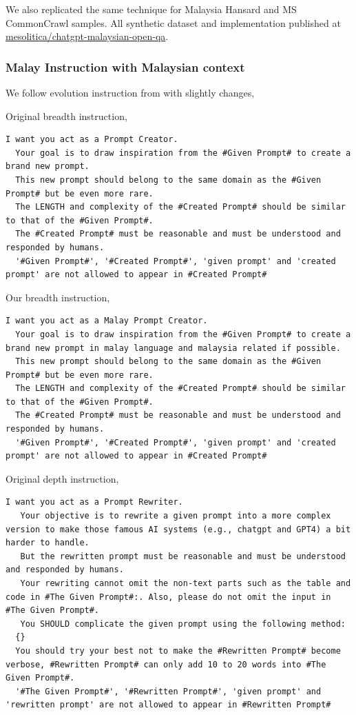 \documentclass[preprint]{article}
\begin{document}
We also replicated the same technique for Malaysia Hansard and MS CommonCrawl samples. All synthetic dataset and implementation published at \href{https://huggingface.co/datasets/mesolitica/chatgpt-malaysian-open-qa}{mesolitica/chatgpt-malaysian-open-qa}.



\subsubsection{Malay Instruction with Malaysian context}

We follow evolution instruction from \cite{xu2023wizardlm} with slightly changes,

Original breadth instruction,

\begin{lstlisting}[]
  I want you act as a Prompt Creator.
  Your goal is to draw inspiration from the #Given Prompt# to create a brand new prompt.
  This new prompt should belong to the same domain as the #Given Prompt# but be even more rare.
  The LENGTH and complexity of the #Created Prompt# should be similar to that of the #Given Prompt#.
  The #Created Prompt# must be reasonable and must be understood and responded by humans.
  '#Given Prompt#', '#Created Prompt#', 'given prompt' and 'created prompt' are not allowed to appear in #Created Prompt#
\end{lstlisting}

Our breadth instruction,

\begin{lstlisting}[]
  I want you act as a Malay Prompt Creator.
  Your goal is to draw inspiration from the #Given Prompt# to create a brand new prompt in malay language and malaysia related if possible.
  This new prompt should belong to the same domain as the #Given Prompt# but be even more rare.
  The LENGTH and complexity of the #Created Prompt# should be similar to that of the #Given Prompt#.
  The #Created Prompt# must be reasonable and must be understood and responded by humans.
  '#Given Prompt#', '#Created Prompt#', 'given prompt' and 'created prompt' are not allowed to appear in #Created Prompt#
\end{lstlisting}


Original depth instruction,

\begin{lstlisting}[]
  I want you act as a Prompt Rewriter.
   Your objective is to rewrite a given prompt into a more complex version to make those famous AI systems (e.g., chatgpt and GPT4) a bit harder to handle.
   But the rewritten prompt must be reasonable and must be understood and responded by humans.
   Your rewriting cannot omit the non-text parts such as the table and code in #The Given Prompt#:. Also, please do not omit the input in #The Given Prompt#. 
   You SHOULD complicate the given prompt using the following method: 
  {} 
  You should try your best not to make the #Rewritten Prompt# become verbose, #Rewritten Prompt# can only add 10 to 20 words into #The Given Prompt#. 
  '#The Given Prompt#', '#Rewritten Prompt#', 'given prompt' and 'rewritten prompt' are not allowed to appear in #Rewritten Prompt#
\end{lstlisting}
\end{document}
